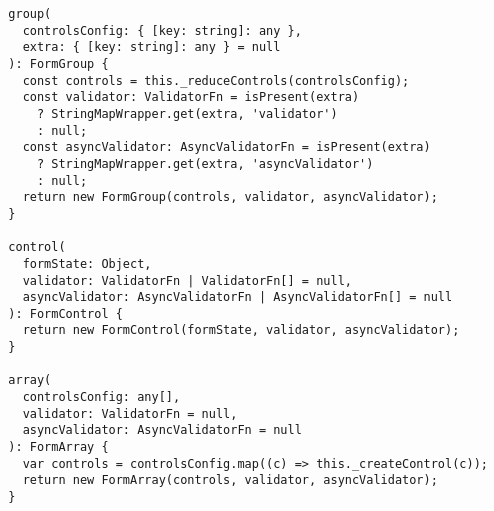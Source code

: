 \begin{verbatim}
  group(
    controlsConfig: { [key: string]: any },
    extra: { [key: string]: any } = null
  ): FormGroup {
    const controls = this._reduceControls(controlsConfig);
    const validator: ValidatorFn = isPresent(extra)
      ? StringMapWrapper.get(extra, 'validator')
      : null;
    const asyncValidator: AsyncValidatorFn = isPresent(extra)
      ? StringMapWrapper.get(extra, 'asyncValidator')
      : null;
    return new FormGroup(controls, validator, asyncValidator);
  }

  control(
    formState: Object,
    validator: ValidatorFn | ValidatorFn[] = null,
    asyncValidator: AsyncValidatorFn | AsyncValidatorFn[] = null
  ): FormControl {
    return new FormControl(formState, validator, asyncValidator);
  }

  array(
    controlsConfig: any[],
    validator: ValidatorFn = null,
    asyncValidator: AsyncValidatorFn = null
  ): FormArray {
    var controls = controlsConfig.map((c) => this._createControl(c));
    return new FormArray(controls, validator, asyncValidator);
  }
\end{verbatim}
